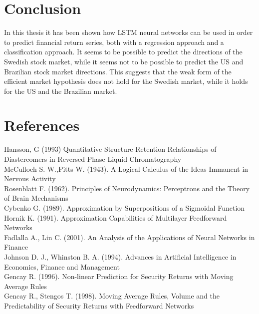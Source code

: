 \documentclass[12pt, letterpaper]{amsart}%
\begin{document}
\section{Conclusion}
In this thesis it has been shown how LSTM neural networks can be used in order to predict financial return series, both with a regression approach and a classification approach. It seems to be possible to predict the directions of the Swedish stock market, while it seems not to be possible to predict the US and Brazilian stock market directions. This suggests that the weak form of the efficient market hypothesis does not hold for the Swedish market, while it holds for the US and the Brazilian market.

\newpage

\section{References}
Hansson, G (1993) Quantitative Structure-Retention Relationships of Diastereomers in Reversed-Phase Liquid Chromatography
\\

McCulloch S. W.,Pitts W. (1943). A Logical Calculus of the Ideas Immanent in Nervous Activity
\\

Rosenblatt F. (1962). Principles of Neurodynamics: Perceptrons and the Theory of Brain Mechanisms
\\

Cybenko G. (1989). Approximation by Superpositions of a Sigmoidal Function
\\

Hornik K. (1991). Approximation Capabilities of Multilayer Feedforward Networks
\\



Fadlalla A., Lin C. (2001). An Analysis of the Applications of Neural Networks in Finance
\\

Johnson D. J., Whinston B. A. (1994). Advances in Artificial Intelligence in Economics, Finance and Management
\\




Gencay R. (1996). Non-linear Prediction for Security Returns with Moving Average Rules
\\

Gencay R., Stengos T. (1998). Moving Average Rules, Volume and the Predictability of Security Returns with Feedforward Networks
\\
\end{document}
